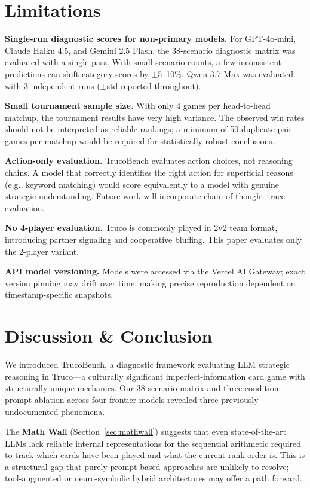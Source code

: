 \documentclass[11pt]{article}
\begin{document}
\section{Limitations}
\label{sec:limitations}

\textbf{Single-run diagnostic scores for non-primary models.} For GPT-4o-mini, Claude Haiku 4.5, and Gemini 2.5 Flash, the 38-scenario diagnostic matrix was evaluated with a single pass. With small scenario counts, a few inconsistent predictions can shift category scores by $\pm$5--10\%. Qwen 3.7 Max was evaluated with 3 independent runs ($\pm$std reported throughout).

\textbf{Small tournament sample size.} With only 4 games per head-to-head matchup, the tournament results have very high variance. The observed win rates should not be interpreted as reliable rankings; a minimum of 50 duplicate-pair games per matchup would be required for statistically robust conclusions.

\textbf{Action-only evaluation.} TrucoBench evaluates action choices, not reasoning chains. A model that correctly identifies the right action for superficial reasons (e.g., keyword matching) would score equivalently to a model with genuine strategic understanding. Future work will incorporate chain-of-thought trace evaluation.

\textbf{No 4-player evaluation.} Truco is commonly played in 2v2 team format, introducing partner signaling and cooperative bluffing. This paper evaluates only the 2-player variant.

\textbf{API model versioning.} Models were accessed via the Vercel AI Gateway; exact version pinning may drift over time, making precise reproduction dependent on timestamp-specific snapshots.

\section{Discussion \& Conclusion}

We introduced TrucoBench, a diagnostic framework evaluating LLM strategic reasoning in Truco---a culturally significant imperfect-information card game with structurally unique mechanics. Our 38-scenario matrix and three-condition prompt ablation across four frontier models revealed three previously undocumented phenomena.

The \textbf{Math Wall} (Section~\ref{sec:mathwall}) suggests that even state-of-the-art LLMs lack reliable internal representations for the sequential arithmetic required to track which cards have been played and what the current rank order is. This is a structural gap that purely prompt-based approaches are unlikely to resolve; tool-augmented or neuro-symbolic hybrid architectures \cite{toolpoker2026} may offer a path forward.
\end{document}
